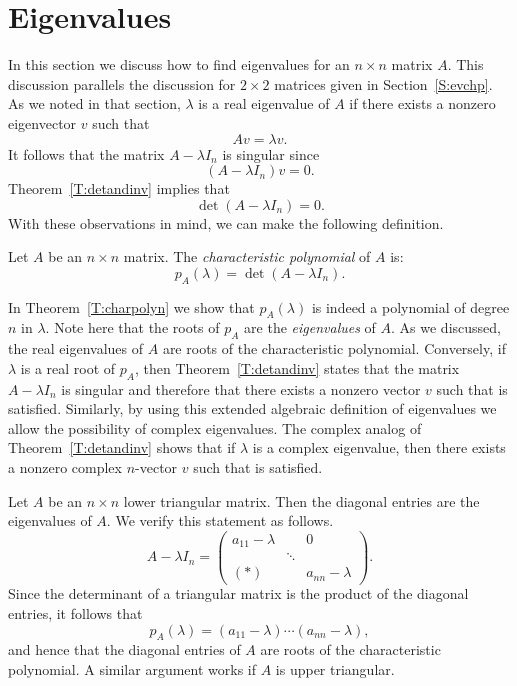 \documentclass{ximera}
\begin{document}
\section{Eigenvalues} \label{S:eig} 
 
In this section we discuss how to find eigenvalues for an
$n\times n$ matrix $A$.  This discussion parallels the
discussion for $2\times 2$ matrices given in
Section~\ref{S:evchp}.  As we noted in that section, $\lambda$
is a real eigenvalue of $A$ if there exists a nonzero
eigenvector $v$ such that
\begin{equation}  \label{e:eigen}
Av = \lambda v.
\end{equation}
It follows that the matrix $A-\lambda I_n$ is 
singular since
\[
(A-\lambda I_n)v = 0.
\]
Theorem~\ref{T:detandinv} implies that 
\[
\det(A-\lambda I_n) = 0.
\]
With these observations in mind, we can make the following definition.
\begin{Def}   \label{D:charpoly}
Let $A$ be an $n\times n$ matrix.  The {\em characteristic polynomial\/} 
of $A$ is:
\[
p_A(\lambda) = \det(A-\lambda I_n).
\]  
\end{Def}

In Theorem~\ref{T:charpolyn} we show that $p_A(\lambda)$ is indeed a 
polynomial of degree $n$ in $\lambda$.  Note here that the roots of 
$p_A$ are the {\em eigenvalues\/} of $A$. As we
discussed, the real eigenvalues 
of $A$ are roots of the
characteristic polynomial.   Conversely, if
$\lambda$ is a real root of $p_A$, then
Theorem~\ref{T:detandinv} states that the matrix $A-\lambda I_n$
is singular and therefore that there exists a nonzero vector $v$
such that  is satisfied.  Similarly, by using this
extended algebraic definition of eigenvalues we allow the
possibility of complex eigenvalues.  
The complex analog of
Theorem~\ref{T:detandinv} shows that if $\lambda$ is a complex
eigenvalue, then there exists a nonzero complex $n$-vector $v$
such that  is satisfied.

\begin{exam} \label{E:triangular}
Let $A$ be an $n\times n$ lower triangular matrix.  Then the
diagonal entries are the eigenvalues of $A$.  {\rm We verify
this statement as follows.  
\[
A-\lambda I_n = \left(\begin{array}{ccc} a_{11}-\lambda &  & 0 \\
 &  \ddots &  \\ (*) & & a_{nn}-\lambda \end{array}\right).
\]
Since the determinant of a triangular matrix is the product of
the diagonal entries, it follows that 
\begin{equation}  \label{e:triangpoly}
p_A(\lambda) = (a_{11}-\lambda)\cdots(a_{nn}-\lambda),
\end{equation}
and hence that the diagonal entries of $A$ are roots of the 
characteristic polynomial. A similar argument works if $A$ is
upper triangular.}
\end{exam}  
 
\end{document}
